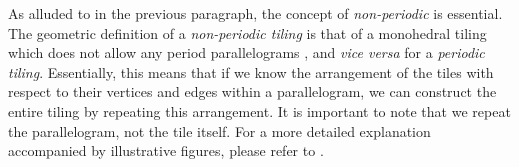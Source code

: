 \documentclass[../thesis.tex]{subfiles}
\begin{document}
As alluded to in the previous paragraph, the concept of \emph{non-periodic} is essential. The geometric  definition of a \emph{non-periodic tiling} is that of a monohedral tiling which does not allow any period parallelograms \cite{penrosePentaplexityClassNonPeriodic1979}, and \emph{vice versa} for a \emph{periodic tiling}. Essentially, this means that if we know the arrangement of the tiles with respect to their vertices and edges within a parallelogram, we can construct the entire tiling by repeating this arrangement. It is important to note that we repeat the parallelogram, not the tile itself. For a more detailed explanation accompanied by illustrative figures, please refer to \cite[p.29-30,147-149]{grunbaumTilingsPatterns1987}. 
\end{document}
